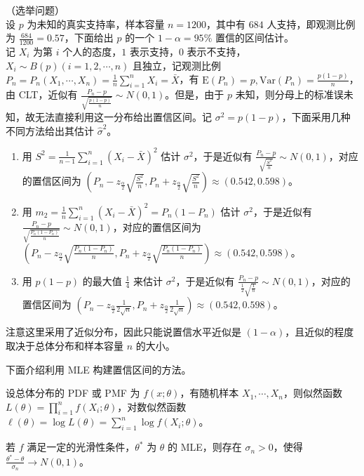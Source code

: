 \documentclass[../main.tex]{subfiles}
\begin{document}
\begin{example}
    （选举问题）\\
    设 $p$ 为未知的真实支持率，样本容量 $n=1200$，其中有 $684$ 人支持，即观测比例为 $\frac{684}{1200}=0.57$，下面给出 $p$ 的一个 $1-\alpha=95\%$ 置信的区间估计。\\
    记 $X_i$ 为第 $i$ 个人的态度，$1$ 表示支持，$0$ 表示不支持，$X_i\sim B(p)(i=1,2,\cdots,n)$ 且独立，记观测比例 $P_n=P_n(X_1,\cdots,X_n)=\frac1n\sum_{i=1}^nX_i=\bar X$，有 $\mathrm E(P_n)=p,\mathrm{Var}(P_n)=\frac{p(1-p)}n$，由 CLT，近似有 $\frac{P_n-p}{\sqrt{\frac{p(1-p)}n}}\sim N(0,1)$。但是，由于 $p$ 未知，则分母上的标准误未知，故无法直接利用这一分布给出置信区间。记 $\sigma^2=p(1-p)$，下面采用几种不同方法给出其估计 $\hat\sigma^2$。
    \begin{enumerate}
        \item 用 $S^2=\frac1{n-1}\sum_{i=1}^n(X_i-\bar X)^2$ 估计 $\sigma^2$，于是近似有 $\frac{P_n-p}{\sqrt{\frac{S^2}n}}\sim N(0,1)$，对应的置信区间为 $(P_n-z_{\frac\alpha2}\sqrt{\frac{S^2}n},P_n+z_{\frac\alpha2}\sqrt{\frac{S^2}n})\approx(0.542,0.598)$。
        \item 用 $m_2=\frac1n\sum_{i=1}^n(X_i-\bar X)^2=P_n(1-P_n)$ 估计 $\sigma^2$，于是近似有 $\frac{P_n-p}{\sqrt{\frac{P_n(1-P_n)}n}}\sim N(0,1)$，对应的置信区间为 $(P_n-z_{\frac\alpha2}\sqrt{\frac{P_n(1-P_n)}n},P_n+z_{\frac\alpha2}\sqrt{\frac{P_n(1-P_n)}n})\approx(0.542,0.598)$。
        \item 用 $p(1-p)$ 的最大值 $\frac14$ 来估计 $\sigma^2$，于是近似有 $\frac{P_n-p}{\frac12\sqrt{\frac1n}}\sim N(0,1)$，对应的置信区间为 $(P_n-z_{\frac\alpha2}\frac1{2\sqrt{n}},P_n+z_{\frac\alpha2}\frac1{2\sqrt{n}})\approx(0.542,0.598)$。
    \end{enumerate}
\end{example}

注意这里采用了近似分布，因此只能说置信水平近似是 $(1-\alpha)$，且近似的程度取决于总体分布和样本容量 $n$ 的大小。

下面介绍利用 MLE 构建置信区间的方法。

设总体分布的 PDF 或 PMF 为 $f(x;\theta)$，有随机样本 $X_1,\cdots,X_n$，则似然函数 $L(\theta)=\prod_{i=1}^nf(X_i;\theta)$，对数似然函数 $\ell(\theta)=\log L(\theta)=\sum_{i=1}^n\log f(X_i;\theta)$。

\begin{theorem}\label{thm:6.4.1}
    若 $f$ 满足一定的光滑性条件，$\theta^*$ 为 $\theta$ 的 MLE，则存在 $\sigma_n>0$，使得 $\frac{\theta^*-\theta}{\sigma_n}\rightarrow N(0,1)$。
\end{theorem}
\end{document}
